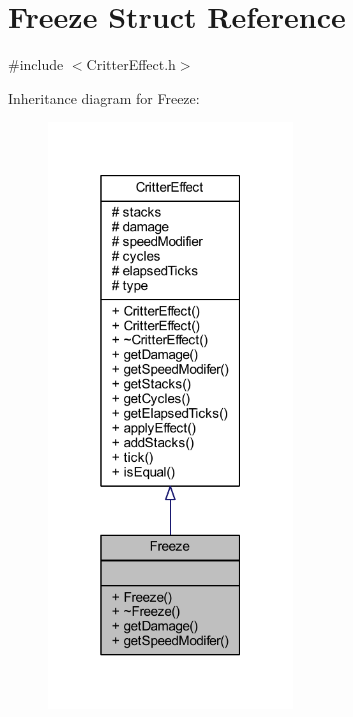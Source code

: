 \hypertarget{struct_freeze}{\section{Freeze Struct Reference}
\label{struct_freeze}
}


{\ttfamily \#include $<$Critter\+Effect.\+h$>$}



Inheritance diagram for Freeze\+:
\nopagebreak
\begin{figure}[H]
\begin{center}
\leavevmode
\includegraphics[width=184pt]{struct_freeze__inherit__graph}
\end{center}
\end{figure}


